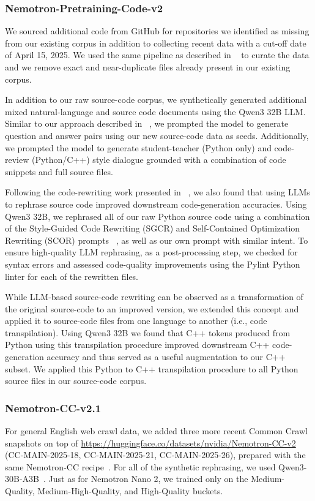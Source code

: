\subsubsection{Nemotron-Pretraining-Code-v2}
We sourced additional code from GitHub for repositories we identified as missing from our existing corpus in addition to collecting recent data with a cut-off date of April 15, 2025. We used the same pipeline as described in ~\cite{nemotronnanov2} to curate the data and we remove exact and near-duplicate files already present in our existing corpus.

In addition to our raw source-code corpus, we synthetically generated additional mixed natural-language and source code documents using the Qwen3 32B LLM. Similar to our approach described in ~\cite{nvidia2025nemotronhfamilyaccurateefficient}, we prompted the model to generate question and answer pairs using our new source-code data as seeds. Additionally, we prompted the model to generate student-teacher (Python only) and code-review (Python/C++) style dialogue grounded with a combination of code snippets and full source files.

Following the code-rewriting work presented in ~\cite{fujii2025rewriting}, we also found that using LLMs to rephrase source code improved downstream code-generation accuracies. Using Qwen3 32B, we rephrased all of our raw Python source code using a combination of the Style-Guided Code Rewriting (SGCR) and Self-Contained Optimization Rewriting (SCOR) prompts ~\citep{fujii2025rewriting}, as well as our own prompt with similar intent. To ensure high-quality LLM rephrasing, as a post-processing step, we checked for syntax errors and assessed code-quality improvements using the Pylint Python linter for each of the rewritten files.

While LLM-based source-code rewriting can be observed as a transformation of the original source-code to an improved version, we extended this concept and applied it to source-code files from one language to another (i.e., code transpilation). Using Qwen3 32B we found that C++ tokens produced from Python using this transpilation procedure improved downstream C++ code-generation accuracy and thus served as a useful augmentation to our C++ subset. We applied this Python to C++ transpilation procedure to all Python source files in our source-code corpus.


\subsubsection{Nemotron-CC-v2.1}
For general English web crawl data, we added three more recent Common Crawl snapshots on top of \href{Nemotron-CC-v2}{https://huggingface.co/datasets/nvidia/Nemotron-CC-v2} (CC-MAIN-2025-18, CC-MAIN-2025-21, CC-MAIN-2025-26), prepared with the same Nemotron-CC recipe~\citep{su2024nemotroncctransformingcommoncrawl}. For all of the synthetic rephrasing, we used Qwen3-30B-A3B~\citep{yang2025qwen3technicalreport}. Just as for Nemotron Nano 2, we trained only on the Medium-Quality, Medium-High-Quality, and High-Quality buckets.

